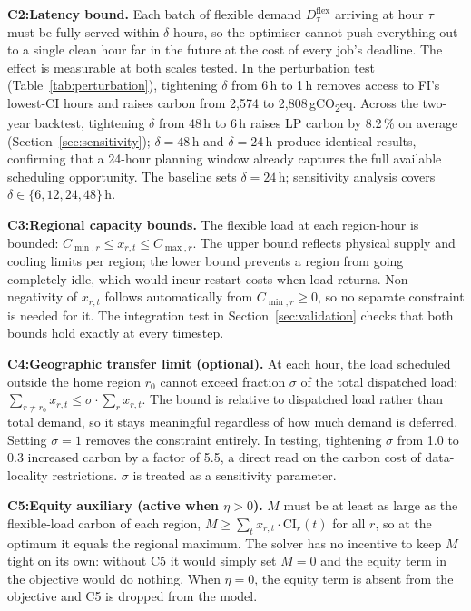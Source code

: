 \documentclass[11pt, a4paper]{article}
\begin{document}
\textbf{C2:Latency bound.}
Each batch of flexible demand $D_{\tau}^{\text{flex}}$ arriving at hour $\tau$ must be fully served within $\delta$ hours, so the optimiser cannot push everything out to a single clean hour far in the future at the cost of every job's deadline. The effect is measurable at both scales tested. In the perturbation test (Table~\ref{tab:perturbation}), tightening $\delta$ from 6\,h to 1\,h removes access to FI's lowest-CI hours and raises carbon from 2{,}574 to 2{,}808\,gCO\textsubscript{2}eq. Across the two-year backtest, tightening $\delta$ from 48\,h to 6\,h raises LP carbon by 8.2\,\% on average (Section~\ref{sec:sensitivity}); $\delta = 48$\,h and $\delta = 24$\,h produce identical results, confirming that a 24-hour planning window already captures the full available scheduling opportunity. The baseline sets $\delta = 24$\,h; sensitivity analysis covers $\delta \in \{6, 12, 24, 48\}$\,h.

\textbf{C3:Regional capacity bounds.}
The flexible load at each region-hour is bounded: $C_{\min,r} \leq x_{r,t} \leq C_{\max,r}$. The upper bound reflects physical supply and cooling limits per region; the lower bound prevents a region from going completely idle, which would incur restart costs when load returns. Non-negativity of $x_{r,t}$ follows automatically from $C_{\min,r} \geq 0$, so no separate constraint is needed for it. The integration test in Section~\ref{sec:validation} checks that both bounds hold exactly at every timestep.

\textbf{C4:Geographic transfer limit (optional).}
At each hour, the load scheduled outside the home region $r_0$ cannot exceed fraction $\sigma$ of the total dispatched load: $\sum_{r \neq r_0} x_{r,t} \leq \sigma \cdot \sum_r x_{r,t}$. The bound is relative to dispatched load rather than total demand, so it stays meaningful regardless of how much demand is deferred. Setting $\sigma = 1$ removes the constraint entirely. In testing, tightening $\sigma$ from 1.0 to 0.3 increased carbon by a factor of 5.5, a direct read on the carbon cost of data-locality restrictions. $\sigma$ is treated as a sensitivity parameter.

\textbf{C5:Equity auxiliary (active when $\eta > 0$).}
$M$ must be at least as large as the flexible-load carbon of each region, $M \geq \sum_t x_{r,t} \cdot \text{CI}_r(t)$ for all $r$, so at the optimum it equals the regional maximum. The solver has no incentive to keep $M$ tight on its own: without C5 it would simply set $M = 0$ and the equity term in the objective would do nothing. When $\eta = 0$, the equity term is absent from the objective and C5 is dropped from the model.
\end{document}
